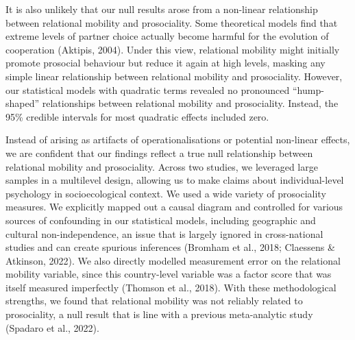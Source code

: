 \documentclass[
  man,floatsintext]{apa6}
\begin{document}
It is also unlikely that our null results arose from a non-linear relationship between relational mobility and prosociality. Some theoretical models find that extreme levels of partner choice actually become harmful for the evolution of cooperation (Aktipis, 2004). Under this view, relational mobility might initially promote prosocial behaviour but reduce it again at high levels, masking any simple linear relationship between relational mobility and prosociality. However, our statistical models with quadratic terms revealed no pronounced ``hump-shaped'' relationships between relational mobility and prosociality. Instead, the 95\% credible intervals for most quadratic effects included zero.

Instead of arising as artifacts of operationalisations or potential non-linear effects, we are confident that our findings reflect a true null relationship between relational mobility and prosociality. Across two studies, we leveraged large samples in a multilevel design, allowing us to make claims about individual-level psychology in socioecological context. We used a wide variety of prosociality measures. We explicitly mapped out a causal diagram and controlled for various sources of confounding in our statistical models, including geographic and cultural non-independence, an issue that is largely ignored in cross-national studies and can create spurious inferences (Bromham et al., 2018; Claessens \& Atkinson, 2022). We also directly modelled measurement error on the relational mobility variable, since this country-level variable was a factor score that was itself measured imperfectly (Thomson et al., 2018). With these methodological strengths, we found that relational mobility was not reliably related to prosociality, a null result that is line with a previous meta-analytic study (Spadaro et al., 2022).
\end{document}
